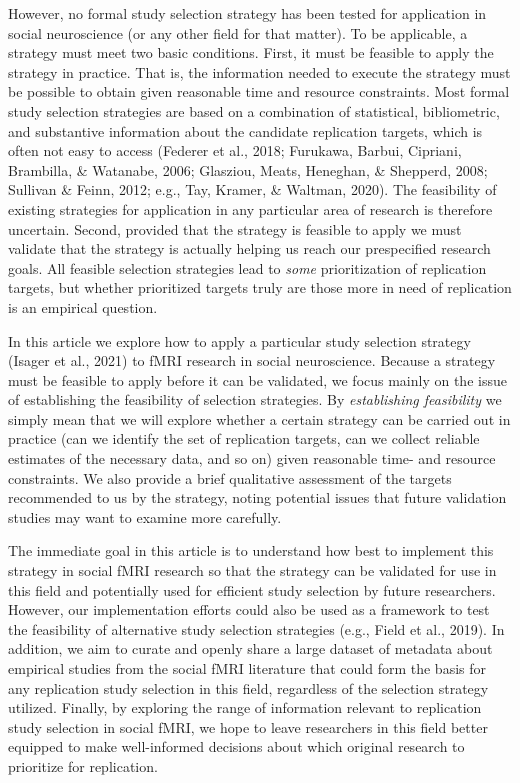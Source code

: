 \documentclass[
  man,floatsintext]{apa6}
\begin{document}
However, no formal study selection strategy has been tested for application in social neuroscience (or any other field for that matter). To be applicable, a strategy must meet two basic conditions. First, it must be feasible to apply the strategy in practice. That is, the information needed to execute the strategy must be possible to obtain given reasonable time and resource constraints. Most formal study selection strategies are based on a combination of statistical, bibliometric, and substantive information about the candidate replication targets, which is often not easy to access (Federer et al., 2018; Furukawa, Barbui, Cipriani, Brambilla, \& Watanabe, 2006; Glasziou, Meats, Heneghan, \& Shepperd, 2008; Sullivan \& Feinn, 2012; e.g., Tay, Kramer, \& Waltman, 2020). The feasibility of existing strategies for application in any particular area of research is therefore uncertain. Second, provided that the strategy is feasible to apply we must validate that the strategy is actually helping us reach our prespecified research goals. All feasible selection strategies lead to \emph{some} prioritization of replication targets, but whether prioritized targets truly are those more in need of replication is an empirical question.

In this article we explore how to apply a particular study selection strategy (Isager et al., 2021) to fMRI research in social neuroscience. Because a strategy must be feasible to apply before it can be validated, we focus mainly on the issue of establishing the feasibility of selection strategies. By \emph{establishing feasibility} we simply mean that we will explore whether a certain strategy can be carried out in practice (can we identify the set of replication targets, can we collect reliable estimates of the necessary data, and so on) given reasonable time- and resource constraints. We also provide a brief qualitative assessment of the targets recommended to us by the strategy, noting potential issues that future validation studies may want to examine more carefully.

The immediate goal in this article is to understand how best to implement this strategy in social fMRI research so that the strategy can be validated for use in this field and potentially used for efficient study selection by future researchers. However, our implementation efforts could also be used as a framework to test the feasibility of alternative study selection strategies (e.g., Field et al., 2019). In addition, we aim to curate and openly share a large dataset of metadata about empirical studies from the social fMRI literature that could form the basis for any replication study selection in this field, regardless of the selection strategy utilized. Finally, by exploring the range of information relevant to replication study selection in social fMRI, we hope to leave researchers in this field better equipped to make well-informed decisions about which original research to prioritize for replication.
\end{document}
